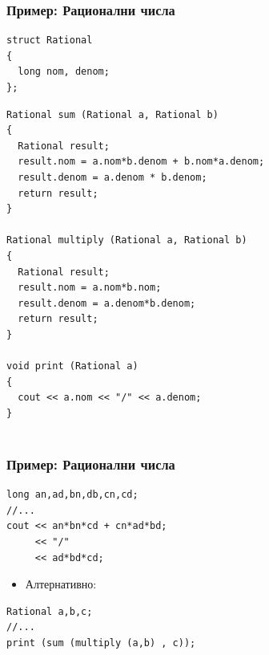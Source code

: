 \documentclass{beamer}
\begin{document}
\begin{frame}[fragile]
\frametitle{Пример: Рационални числа}

\begin{lstlisting}
struct Rational
{
  long nom, denom;
};
\end{lstlisting}

\begin{lstlisting}
Rational sum (Rational a, Rational b)
{
  Rational result;
  result.nom = a.nom*b.denom + b.nom*a.denom;
  result.denom = a.denom * b.denom;
  return result;
}

Rational multiply (Rational a, Rational b)
{
  Rational result;
  result.nom = a.nom*b.nom;
  result.denom = a.denom*b.denom;
  return result;
}

void print (Rational a)
{
  cout << a.nom << "/" << a.denom;
}


\end{lstlisting}

\end{frame}


\begin{frame}[fragile]
\frametitle{Пример: Рационални числа}


\begin{lstlisting}
long an,ad,bn,db,cn,cd;
//...
cout << an*bn*cd + cn*ad*bd;
     << "/"
     << ad*bd*cd;
\end{lstlisting}

\begin{itemize}
  \item Алтернативно:
\end{itemize}


\begin{lstlisting}
Rational a,b,c;
//...
print (sum (multiply (a,b) , c));
\end{lstlisting}

\end{frame}
\end{document}
